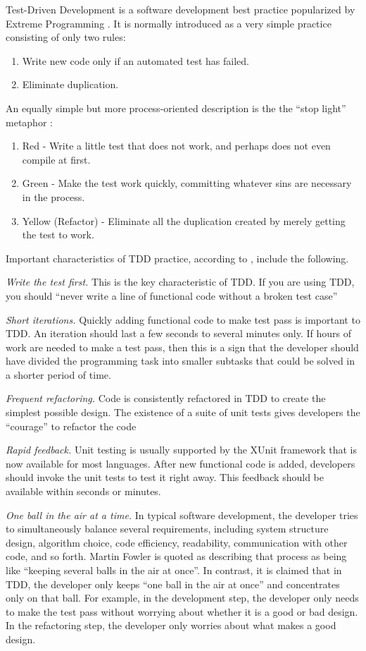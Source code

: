 \documentclass[smallextended]{svjour3}     %
\begin{document}
Test-Driven Development \citep{Beck:03} is a software development 
best practice popularized by Extreme Programming \citep{Jeffries:00,Beck:00}. 
It is normally introduced as a very simple practice consisting of only two rules:

\begin{enumerate}
\item Write new code only if an automated test has failed.
\item Eliminate duplication.
\end{enumerate} 

An equally simple but more process-oriented description is the the 
``stop light'' metaphor \citep{Beck:03}: 
\begin{enumerate}
\item Red - Write a little test that does not work, and perhaps does not even compile at first.
\item Green - Make the test work quickly, committing whatever sins are necessary in the process.
\item Yellow (Refactor) - Eliminate all the duplication created by merely getting the test to work.
\end{enumerate}

Important characteristics of TDD practice, according to \citep{Beck:01,Beck:03},  include the following.

{\em Write the test first.}
This is the key characteristic of TDD. If you are using 
TDD, you should ``never write a line of functional 
code without a broken test case''

{\em Short iterations.}
Quickly adding functional code to make test pass is important
to TDD. An iteration should last a few seconds to 
several minutes only. If hours of work are needed to make a 
test pass, then this is a sign that the developer should have divided the programming 
task into smaller subtasks that could be solved in a shorter
period of time.

{\em Frequent refactoring.}
Code is consistently refactored in TDD to create the simplest
possible design. The existence of a suite of unit tests gives 
developers the ``courage'' to refactor the code

{\em Rapid feedback.}
Unit testing is usually supported by the XUnit
framework that is now available for most languages.
After new functional code is added, developers should invoke
the unit tests to test it right away. This feedback should be available
within seconds or minutes. 

{\em One ball in the air at a time.}  In typical software development, the
developer tries to simultaneously balance several requirements, including
system structure design, algorithm choice, code efficiency, readability,
communication with other code, and so forth.  Martin Fowler is quoted as
describing that process as being like ``keeping several balls in the air at
once''.  In contrast, it is claimed that in TDD, the developer only keeps
``one ball in the air at once'' and concentrates only on that ball. For
example, in the development step, the developer only needs to make the test
pass without worrying about whether it is a good or bad design. In the
refactoring step, the developer only worries about what makes a good
design.
\end{document}
